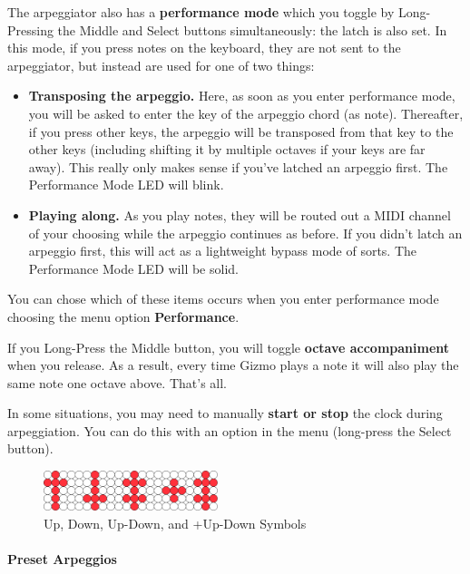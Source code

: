 \documentclass{article}
\begin{document}
The arpeggiator also has a {\bf performance mode} which you toggle by Long-Pressing the Middle and Select buttons simultaneously: the latch is also set.  In this mode, if you press notes on the keyboard, they are not sent to the arpeggiator, but instead are used for one of two things:
	\begin{itemize}
	\item {\bf Transposing the arpeggio.}  Here, as soon as you enter performance mode, you will be asked to enter the key of the arpeggio chord (as note).  Thereafter, if you press other keys, the arpeggio will be transposed from that key to the other keys (including shifting it by multiple octaves if your keys are far away).  This really only makes sense if you've latched an arpeggio first.  The Performance Mode LED will blink.
	\item {\bf Playing along.}  As you play notes, they will be routed out a MIDI channel of your choosing while the arpeggio continues as before.  If you didn't latch an arpeggio first, this will act as a lightweight bypass mode of sorts. The Performance Mode LED will be solid.
	\end{itemize}
You can chose which of these items occurs when you enter performance mode choosing the menu option {\bf Performance}.

If you Long-Press the Middle button, you will toggle {\bf octave accompaniment} when you release.  As a result, every time Gizmo plays a note it will also play the same note one octave above.  That's all.

In some situations, you may need to manually {\bf start or stop} the clock during arpeggiation.  You can do this with an option in the menu (long-press the Select button).

\begin{figure}
\begin{center}
\vspace{-1em}
\includegraphics[width=2.0in]{updown}
\vspace{-1em}
\caption{\small Up, Down, Up-Down, and +Up-Down Symbols}
\vspace{-3em}
\end{center}
\end{figure}

\paragraph{Preset Arpeggios}
\end{document}

